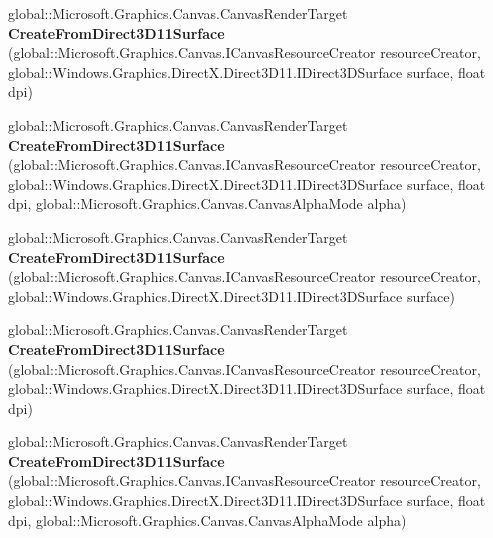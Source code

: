 \begin{DoxyCompactItemize}
global\+::\+Microsoft.\+Graphics.\+Canvas.\+Canvas\+Render\+Target {\bfseries Create\+From\+Direct3\+D11\+Surface} (global\+::\+Microsoft.\+Graphics.\+Canvas.\+I\+Canvas\+Resource\+Creator resource\+Creator, global\+::\+Windows.\+Graphics.\+Direct\+X.\+Direct3\+D11.\+I\+Direct3\+D\+Surface surface, float dpi)
\item 
\mbox{\label{interface_microsoft_1_1_graphics_1_1_canvas_1_1_i_canvas_render_target_statics_a8416b671ded635e82d95a7581e4d8d67}} 
global\+::\+Microsoft.\+Graphics.\+Canvas.\+Canvas\+Render\+Target {\bfseries Create\+From\+Direct3\+D11\+Surface} (global\+::\+Microsoft.\+Graphics.\+Canvas.\+I\+Canvas\+Resource\+Creator resource\+Creator, global\+::\+Windows.\+Graphics.\+Direct\+X.\+Direct3\+D11.\+I\+Direct3\+D\+Surface surface, float dpi, global\+::\+Microsoft.\+Graphics.\+Canvas.\+Canvas\+Alpha\+Mode alpha)
\item 
\mbox{\label{interface_microsoft_1_1_graphics_1_1_canvas_1_1_i_canvas_render_target_statics_a2d0a325b04d1c79f55549238fdde4934}} 
global\+::\+Microsoft.\+Graphics.\+Canvas.\+Canvas\+Render\+Target {\bfseries Create\+From\+Direct3\+D11\+Surface} (global\+::\+Microsoft.\+Graphics.\+Canvas.\+I\+Canvas\+Resource\+Creator resource\+Creator, global\+::\+Windows.\+Graphics.\+Direct\+X.\+Direct3\+D11.\+I\+Direct3\+D\+Surface surface)
\item 
\mbox{\label{interface_microsoft_1_1_graphics_1_1_canvas_1_1_i_canvas_render_target_statics_a4edef1637b0e569998765e88f846b084}} 
global\+::\+Microsoft.\+Graphics.\+Canvas.\+Canvas\+Render\+Target {\bfseries Create\+From\+Direct3\+D11\+Surface} (global\+::\+Microsoft.\+Graphics.\+Canvas.\+I\+Canvas\+Resource\+Creator resource\+Creator, global\+::\+Windows.\+Graphics.\+Direct\+X.\+Direct3\+D11.\+I\+Direct3\+D\+Surface surface, float dpi)
\item 
\mbox{\label{interface_microsoft_1_1_graphics_1_1_canvas_1_1_i_canvas_render_target_statics_a8416b671ded635e82d95a7581e4d8d67}} 
global\+::\+Microsoft.\+Graphics.\+Canvas.\+Canvas\+Render\+Target {\bfseries Create\+From\+Direct3\+D11\+Surface} (global\+::\+Microsoft.\+Graphics.\+Canvas.\+I\+Canvas\+Resource\+Creator resource\+Creator, global\+::\+Windows.\+Graphics.\+Direct\+X.\+Direct3\+D11.\+I\+Direct3\+D\+Surface surface, float dpi, global\+::\+Microsoft.\+Graphics.\+Canvas.\+Canvas\+Alpha\+Mode alpha)

\end{DoxyCompactItemize}

